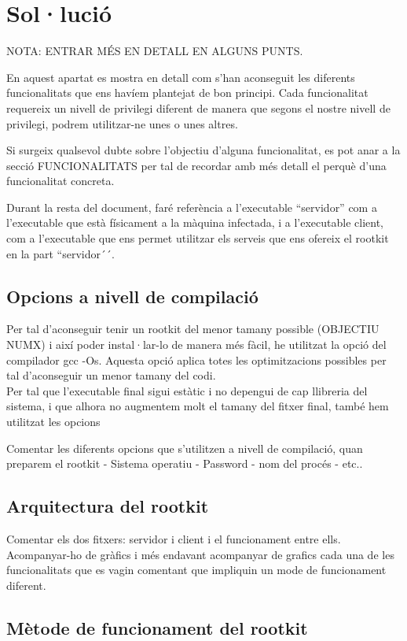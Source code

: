 \chapter{Sol·lució}
NOTA: ENTRAR MÉS EN DETALL EN ALGUNS PUNTS.

En aquest apartat es mostra en detall com s'han aconseguit les diferents funcionalitats que ens havíem plantejat de bon principi.
Cada funcionalitat requereix un nivell de privilegi diferent de manera que segons el nostre nivell de privilegi, podrem utilitzar-ne unes o unes altres.

Si surgeix qualsevol dubte sobre l'objectiu d'alguna funcionalitat, es pot anar a la secció FUNCIONALITATS per tal de recordar amb més detall el perquè d'una funcionalitat concreta.

Durant la resta del document, faré referència a l'executable ``servidor'' com a l'executable que està físicament a la màquina
infectada, i a l'executable client, com a l'executable que ens permet utilitzar els serveis que ens ofereix el rootkit en la part ``servidor´´.

\section{Opcions a nivell de compilació}
Per tal d'aconseguir tenir un rootkit del menor tamany possible (OBJECTIU NUMX) i així poder instal·lar-lo de manera més fàcil, he utilitzat la opció del compilador gcc -Os. Aquesta opció aplica totes les optimitzacions possibles per tal d'aconseguir un menor tamany del codi. \\

Per tal que l'executable final sigui estàtic i no depengui de cap llibreria del sistema, i que alhora no augmentem molt el tamany del fitxer final, també hem utilitzat les opcions 

Comentar les diferents opcions que s'utilitzen a nivell de compilació, quan preparem el rootkit
- Sistema operatiu
- Password
- nom del procés
- etc..

\section{Arquitectura del rootkit}
Comentar els dos fitxers: servidor i client i el funcionament entre ells. Acompanyar-ho de gràfics i més endavant acompanyar de grafics
cada una de les funcionalitats que es vagin comentant que impliquin un mode de funcionament diferent.

\section{Mètode de funcionament del rootkit}

